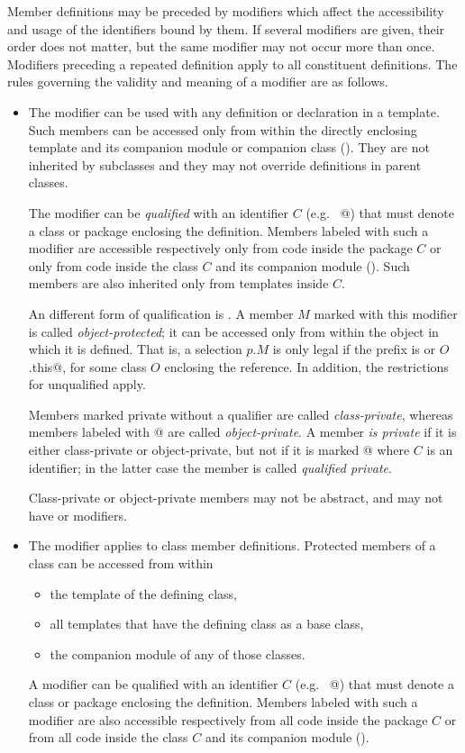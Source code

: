 Member definitions may be preceded by modifiers which affect the
accessibility and usage of the identifiers bound by them.  If several
modifiers are given, their order does not matter, but the same
modifier may not occur more than once.  Modifiers preceding a repeated
definition apply to all constituent definitions.  The rules governing
the validity and meaning of a modifier are as follows.
\begin{itemize}
\item
The  modifier can be used with any definition or
declaration in a template.  Such members can be accessed only from
within the directly enclosing template and its companion module or 
companion class ().  They
are not inherited by subclasses and they may not override definitions
in parent classes.

The modifier can be {\em qualified} with an identifier $C$ (e.g.
~\lstinline@private[$C$]@) that must denote a class or package
enclosing the definition.  Members labeled with such a modifier are
accessible respectively only from code inside the package $C$ or only
from code inside the class $C$ and its companion module
(). Such members are also inherited only from
templates inside $C$.

An different form of qualification is . A member
$M$ marked with this modifier is called {\em object-protected}; it can be accessed only from within
the object in which it is defined. That is, a selection $p.M$ is only
legal if the prefix is  or \lstinline@$O$.this@, for some
class $O$ enclosing the reference. In addition, the restrictions for
unqualified  apply.

Members marked private without a qualifier are called {\em
class-private}, whereas members labeled with \lstinline@private[this]@
are called {\em object-private}.  A member {\em is private} if it is
either class-private or object-private, but not if it is marked
\lstinline@private[$C$]@ where $C$ is an identifier; in the latter
case the member is called {\em qualified private}.

Class-private or object-private members may not be abstract, and may
not have  or  modifiers.
\item
The  modifier applies to class member definitions.
Protected members of a class can be accessed from within
\begin{itemize}
\item the template of the defining class, 
\item all templates that have the defining class as a base class,
\item the companion module of any of those classes.
\end{itemize}
A  modifier can be qualified with an
identifier $C$ (e.g.  ~\lstinline@protected[$C$]@) that must denote a
class or package enclosing the definition.  Members labeled with such
a modifier are also accessible respectively from all code inside the
package $C$ or from all code inside the class $C$ and its companion
module ().


\end{itemize}
